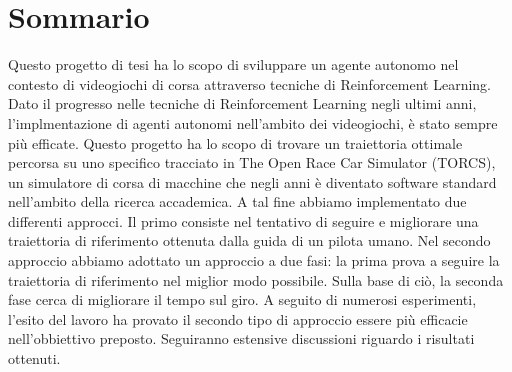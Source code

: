 \newpage
\chapter*{Sommario}


Questo progetto di tesi ha lo scopo di sviluppare un agente autonomo nel contesto di videogiochi di corsa attraverso tecniche di Reinforcement Learning. Dato il progresso nelle tecniche di Reinforcement Learning negli ultimi anni, l'implmentazione di agenti autonomi nell'ambito dei videogiochi, è stato sempre più efficate.
Questo progetto ha lo scopo di trovare un traiettoria ottimale percorsa su uno specifico tracciato in The Open Race Car Simulator (TORCS), un simulatore di corsa di macchine che negli anni è diventato software standard nell'ambito della ricerca accademica.
A tal fine abbiamo implementato due differenti approcci.
Il primo consiste nel tentativo di seguire e migliorare una traiettoria di riferimento ottenuta dalla guida di un pilota umano.
Nel secondo approccio abbiamo adottato un approccio a due fasi: la prima prova a seguire la traiettoria di riferimento nel miglior modo possibile. Sulla base di ciò, la seconda fase cerca di migliorare il tempo sul giro.
A seguito di numerosi esperimenti, l'esito del lavoro ha provato il secondo tipo di approccio essere più efficacie nell'obbiettivo preposto.
Seguiranno estensive discussioni riguardo i risultati ottenuti.